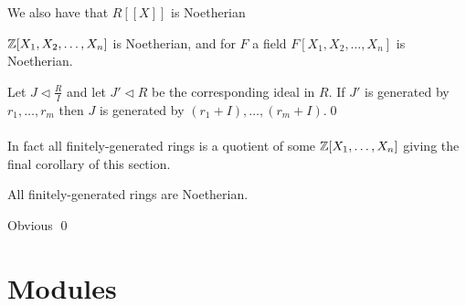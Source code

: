 \documentclass{article}
\newcommand{\nrm}{\triangleleft}
\begin{document}
\begin{itemize}
\\\\
We also have that $ R[[X]] $ is Noetherian
\begin{corollary}
	$ \mathbb{Z}[X_1,X_2,\dots, X_n] $ is Noetherian, and for $ F $ a field $ F[X_1,X_2,\dots, X_n]  $ is Noetherian.
\end{corollary}
\pf Let $ J\nrm \frac RI  $ and let $ J'\nrm R $ be the corresponding ideal in $ R $. If $ J' $ is generated by $ r_1,\dots, r_m $ then $ J $ is generated by $ (r_1+I),\dots, (r_m+I) $.\qed
\\\\
In fact all finitely-generated rings is a quotient of some $ \mathbb{Z}[X_1,\dots, X_n] $ giving the final corollary of this section.
\begin{corollary}
  All finitely-generated rings are Noetherian.
\end{corollary}
\pf Obvious \qed
\section{Modules}

\end{itemize}
\end{document}
